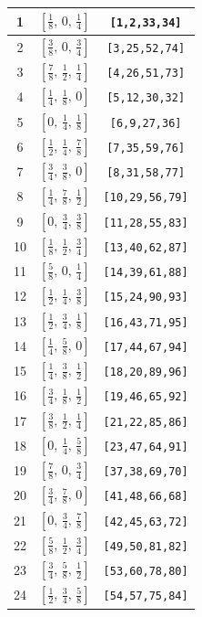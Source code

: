 \documentclass[fleqn,8pt]{jsarticle}
\begin{document}
\begin{longtable}{ccc}
1 & $\left[ \frac{1}{8},\, 0,\, \frac{1}{4} \right]$ & {\tt [1,2,33,34]} \\ \hline
2 & $\left[ \frac{3}{8},\, 0,\, \frac{3}{4} \right]$ & {\tt [3,25,52,74]} \\ \hline
3 & $\left[ \frac{7}{8},\, \frac{1}{2},\, \frac{1}{4} \right]$ & {\tt [4,26,51,73]} \\ \hline
4 & $\left[ \frac{1}{4},\, \frac{1}{8},\, 0 \right]$ & {\tt [5,12,30,32]} \\ \hline
5 & $\left[ 0,\, \frac{1}{4},\, \frac{1}{8} \right]$ & {\tt [6,9,27,36]} \\ \hline
6 & $\left[ \frac{1}{2},\, \frac{1}{4},\, \frac{7}{8} \right]$ & {\tt [7,35,59,76]} \\ \hline
7 & $\left[ \frac{3}{4},\, \frac{3}{8},\, 0 \right]$ & {\tt [8,31,58,77]} \\ \hline
8 & $\left[ \frac{1}{4},\, \frac{7}{8},\, \frac{1}{2} \right]$ & {\tt [10,29,56,79]} \\ \hline
9 & $\left[ 0,\, \frac{3}{4},\, \frac{3}{8} \right]$ & {\tt [11,28,55,83]} \\ \hline
10 & $\left[ \frac{1}{8},\, \frac{1}{2},\, \frac{3}{4} \right]$ & {\tt [13,40,62,87]} \\ \hline
11 & $\left[ \frac{5}{8},\, 0,\, \frac{1}{4} \right]$ & {\tt [14,39,61,88]} \\ \hline
12 & $\left[ \frac{1}{2},\, \frac{1}{4},\, \frac{3}{8} \right]$ & {\tt [15,24,90,93]} \\ \hline
13 & $\left[ \frac{1}{2},\, \frac{3}{4},\, \frac{1}{8} \right]$ & {\tt [16,43,71,95]} \\ \hline
14 & $\left[ \frac{1}{4},\, \frac{5}{8},\, 0 \right]$ & {\tt [17,44,67,94]} \\ \hline
15 & $\left[ \frac{1}{4},\, \frac{3}{8},\, \frac{1}{2} \right]$ & {\tt [18,20,89,96]} \\ \hline
16 & $\left[ \frac{3}{4},\, \frac{1}{8},\, \frac{1}{2} \right]$ & {\tt [19,46,65,92]} \\ \hline
17 & $\left[ \frac{3}{8},\, \frac{1}{2},\, \frac{1}{4} \right]$ & {\tt [21,22,85,86]} \\ \hline
18 & $\left[ 0,\, \frac{1}{4},\, \frac{5}{8} \right]$ & {\tt [23,47,64,91]} \\ \hline
19 & $\left[ \frac{7}{8},\, 0,\, \frac{3}{4} \right]$ & {\tt [37,38,69,70]} \\ \hline
20 & $\left[ \frac{3}{4},\, \frac{7}{8},\, 0 \right]$ & {\tt [41,48,66,68]} \\ \hline
21 & $\left[ 0,\, \frac{3}{4},\, \frac{7}{8} \right]$ & {\tt [42,45,63,72]} \\ \hline
22 & $\left[ \frac{5}{8},\, \frac{1}{2},\, \frac{3}{4} \right]$ & {\tt [49,50,81,82]} \\ \hline
23 & $\left[ \frac{3}{4},\, \frac{5}{8},\, \frac{1}{2} \right]$ & {\tt [53,60,78,80]} \\ \hline
24 & $\left[ \frac{1}{2},\, \frac{3}{4},\, \frac{5}{8} \right]$ & {\tt [54,57,75,84]} \\
\end{longtable}
\end{document}
